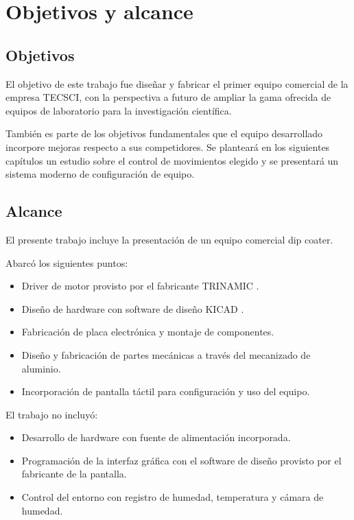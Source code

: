 
\section{Objetivos y alcance}

\subsection{Objetivos}

El objetivo de este trabajo fue diseñar y fabricar el primer equipo comercial de la empresa TECSCI, con la perspectiva a futuro de ampliar la gama ofrecida de equipos de laboratorio para la investigación científica.

También es parte de los objetivos fundamentales que el equipo desarrollado incorpore mejoras respecto a sus competidores. Se planteará en los siguientes capítulos un estudio sobre el control de movimientos elegido y se presentará un sistema moderno de configuración de equipo. 

\subsection{Alcance}

El presente trabajo incluye la presentación de un equipo comercial dip coater. 


Abarcó los siguientes puntos:

\begin{itemize}
\item Driver de motor provisto por el fabricante TRINAMIC \citep{3_web_trinamic}.
\item Diseño de hardware con software de diseño KICAD \citep{web_kicad}.
\item Fabricación de placa electrónica y montaje de componentes.
\item Diseño y fabricación de partes mecánicas a través del mecanizado de aluminio.
\item Incorporación de pantalla táctil para configuración y uso del equipo.
\end{itemize}



El trabajo no incluyó:

\begin{itemize}
\item Desarrollo de hardware con fuente de alimentación incorporada.
\item Programación de la interfaz gráfica con el software de diseño provisto por
el fabricante de la pantalla.
\item Control del entorno con registro de humedad, temperatura y  cámara de humedad.
\end{itemize}


